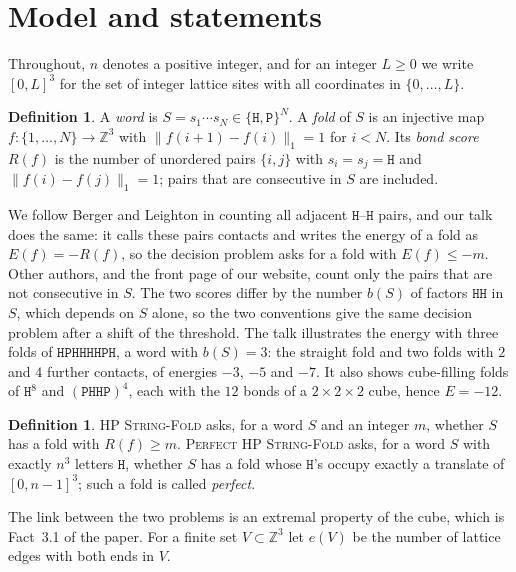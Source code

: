 \documentclass[11pt,letterpaper]{article}
\theoremstyle{definition}
\newtheorem{definition}[theorem]{Definition}
\theoremstyle{remark}
\newcommand{\Hh}{\mathtt{H}}
\newcommand{\Pp}{\mathtt{P}}
\newcommand{\Z}{\mathbb{Z}}
\newcommand{\prob}[1]{\textup{\textsc{#1}}}
\begin{document}
\section{Model and statements}\label{sec:model}

Throughout, $n$ denotes a positive integer, and for an integer $L\ge0$ we write $[0,L]^3$ for the set
of integer lattice sites with all coordinates in $\{0,\dots,L\}$.

\begin{definition}
A \emph{word} is $S=s_1\cdots s_N\in\{\Hh,\Pp\}^N$. A \emph{fold} of $S$ is an injective map
$f:\{1,\dots,N\}\to\Z^3$ with $\|f(i+1)-f(i)\|_1=1$ for $i<N$. Its \emph{bond score} $R(f)$ is the
number of unordered pairs $\{i,j\}$ with $s_i=s_j=\Hh$ and $\|f(i)-f(j)\|_1=1$; pairs that are
consecutive in $S$ are included.
\end{definition}

We follow Berger and Leighton in counting all adjacent $\Hh$--$\Hh$ pairs, and our talk does the
same: it calls these pairs contacts and writes the energy of a fold as $E(f)=-R(f)$, so the
decision problem asks for a fold with $E(f)\le -m$. Other authors, and the front page of our
website, count only the pairs that are not consecutive in $S$. The two scores differ by the number
$b(S)$ of factors $\Hh\Hh$ in $S$, which depends on $S$ alone, so the two conventions give the same
decision problem after a shift of the threshold. The talk illustrates the energy with three folds
of $\Hh\Pp\Hh\Hh\Hh\Hh\Pp\Hh$, a word with $b(S)=3$: the straight fold and two folds with $2$ and $4$
further contacts, of energies $-3$, $-5$ and $-7$. It also shows cube-filling folds of $\Hh^8$ and
$(\Pp\Hh\Hh\Pp)^4$, each with the $12$ bonds of a $2\times2\times2$ cube, hence $E=-12$.

\begin{definition}
\prob{HP String-Fold} asks, for a word $S$ and an integer $m$, whether $S$ has a fold with
$R(f)\ge m$. \prob{Perfect HP String-Fold} asks, for a word $S$ with exactly $n^3$ letters $\Hh$,
whether $S$ has a fold whose $\Hh$'s occupy exactly a translate of $[0,n-1]^3$; such a fold is called
\emph{perfect}.
\end{definition}

The link between the two problems is an extremal property of the cube, which is Fact~3.1 of the
paper. For a finite set $V\subset\Z^3$ let $e(V)$ be the number of lattice edges with both ends in
$V$.
\end{document}
